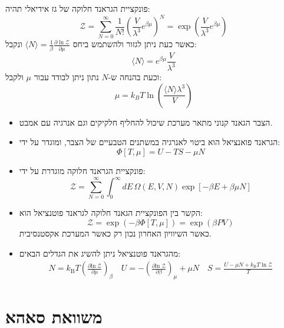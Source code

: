 \documentclass{tstextbook}
\begin{document}
\begin{example}
פונקציית הגראנד חלוקה של גז אידיאלי תהיה:
$${\mathcal{Z}}=\sum_{N=0}^{\infty}{\frac{1}{N!}}\left({\frac{V}{\lambda^{3}}}e^{\beta\mu}\right)^{N}=\exp\left( \frac{V}{\lambda^{3}}e^{ \beta \mu }\right)$$
כאשר כעת ניתן לגזור ולהשתמש ביחס \(\langle N\rangle=\frac{1}{\beta}\frac{\partial\ln{\mathcal{Z}}}{\partial\mu}\) ונקבל:
$$\langle N\rangle=e^{\beta\mu}\frac{V}{\lambda^{3}}$$
וכעת בהנחה ש-\(N\) נתון ניתן לבודד עבור \(\mu\) ולקבל:
$$\mu=k_{B}T\ln\left(\frac{\langle N\rangle\lambda^{3}}{V}\right)$$

\end{example}
\begin{summary}
  \begin{itemize}
    \item הצבר הגאנד קנוני מתאר מערכת שיכול להחליף חלקיקים וגם אנרגיה עם אמבט.
    \item הגראנד פואנציאל הוא ביטוי לאנרגיה במשתנים הטבעיים של הצבר, ומוגדר על ידי:
$$\Phi[T,\mu]=U-T S-\mu N$$
    \item פונקציית הגראנד חלוקה מוגדרת על ידי:
$${\mathcal{Z}}=\sum_{N=0}^{\infty}\int_{0}^{\infty}d E\,\Omega(E,V,N)\exp\left[-\beta E+\beta\mu N\right]$$
    \item הקשר בין הפונקציית הגאנד חלוקה לגראנד פוטנציאל הוא:
$${\mathcal{Z}}=\exp(-\beta \Phi[T,\mu])=\exp(\beta P V)$$
כאשר השיוויון האחרון נכון רק כאשר המערכת אקסטנסיבית.
    \item מהגראנד פוטנציאל ניתן להשיג את הגדלים הבאים:
\begin{gather*}N=k_{\mathrm{B}}T\left({\frac{\partial\mathrm{ln}\;{\mathcal{Z}}}{\partial\mu}}\right)_{\beta}\quad U=-\left(\frac{\partial\mathrm{ln}\;\mathcal{Z}}{\partial\beta}\right)_{\mu}+\mu N\quad S={\frac{U-\mu N+k_{\mathrm{B}}T\ln{\mathcal{Z}}}{T}} 
\end{gather*}
  \end{itemize}
\end{summary}
\section{משוואת סאהא}
\end{document}
